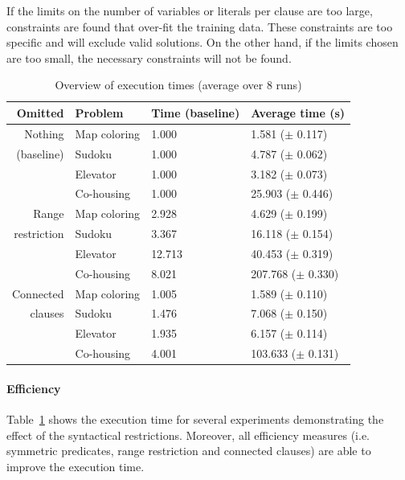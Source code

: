 \documentclass{llncs}
\begin{document}
If the limits on the number of variables or literals per clause are too large, constraints are found that over-fit the training data.
These constraints are too specific and will exclude valid solutions.
On the other hand, if the limits chosen are too small, the necessary constraints will not be found.

\begin{table}
  \caption{Overview of execution times (average over 8 runs)}
  \begin{tabularx}{\linewidth}{rl|ll}

\textbf{Omitted}  & \textbf{Problem}    & \textbf{Time (baseline)}  & \textbf{Average time (s)}\\
\toprule
Nothing          & Map coloring  & 1.000       & 1.581   ($\pm$ 0.117)        \\
   (baseline)                   & Sudoku    & 1.000               & 4.787   ($\pm$ 0.062)    \\
                      & Elevator    & 1.000             & 3.182   ($\pm$ 0.073)  \\
                      & Co-housing  & 1.000             & 25.903  ($\pm$ 0.446)  \\
\midrule
Range      & Map coloring  & 2.928           & 4.629   ($\pm$ 0.199)\\
      restriction                  & Sudoku    & 3.367             & 16.118  ($\pm$ 0.154)  \\
                        & Elevator    & 12.713          & 40.453  ($\pm$ 0.319)\\
                        & Co-housing  & 8.021           & 207.768 ($\pm$ 0.330)\\
\midrule
Connected    & Map coloring  & 1.005           & 1.589   ($\pm$ 0.110)\\
    clauses       & Sudoku    & 1.476                          & 7.068   ($\pm$ 0.150)    \\
                        & Elevator    & 1.935           & 6.157   ($\pm$ 0.114)\\
                        & Co-housing  & 4.001           & 103.633 ($\pm$ 0.131)\\
  \end{tabularx}
  \label{tbl:uitvoering}
\end{table}

\paragraph{Efficiency}
Table~\ref{tbl:uitvoering} shows the execution time for several experiments demonstrating the effect of the syntactical restrictions.
Moreover, all efficiency measures (i.e. symmetric predicates, range restriction and connected clauses) are able to improve the execution time.
\end{document}
